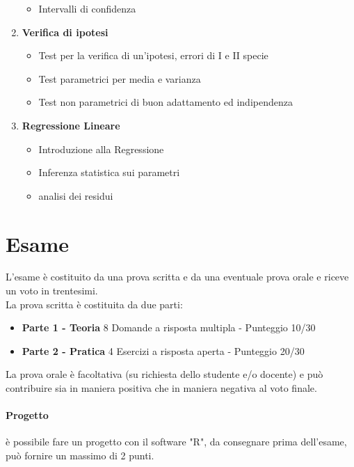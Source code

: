 \begin{enumerate}
\begin{itemize}
        \item Intervalli di confidenza
    \end{itemize}
    \item \textbf{Verifica di ipotesi}
    \begin{itemize}
        \item Test per la verifica di un'ipotesi, errori di I e II specie
        \item Test parametrici per media e varianza
        \item Test non parametrici di buon adattamento ed indipendenza
    \end{itemize}
    \item \textbf{Regressione Lineare}
    \begin{itemize}
        \item Introduzione alla Regressione
        \item Inferenza statistica sui parametri
        \item analisi dei residui 
    \end{itemize}
\end{enumerate}



\section*{Esame}
L'esame è costituito da una prova scritta e da una eventuale prova orale e riceve un voto in trentesimi.
\\La prova scritta è costituita da due parti:
\begin{itemize}
    \item \textbf{Parte 1 - Teoria}
    8 Domande a risposta multipla - Punteggio 10/30
    \item \textbf{Parte 2 - Pratica}
    4 Esercizi a risposta aperta - Punteggio 20/30
\end{itemize}
La prova orale è facoltativa (su richiesta dello studente e/o docente) e può contribuire sia in maniera positiva che in maniera negativa al voto finale.

\paragraph{Progetto}
è possibile fare un progetto con il software "R", da consegnare prima dell'esame, può fornire un massimo di 2 punti.
